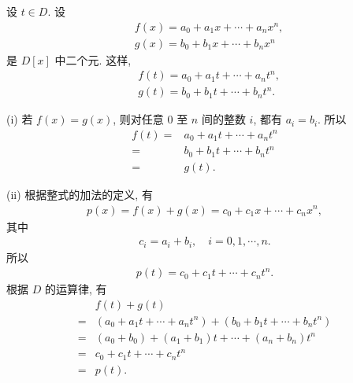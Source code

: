 \begin{pf}
    设 $t \in D$. 设
    \begin{align*}
         & f(x) = a_0 + a_1 x + \cdots + a_n x^n, \\
         & g(x) = b_0 + b_1 x + \cdots + b_n x^n
    \end{align*}
    是 $D[x]$ 中二个元. 这样,
    \begin{align*}
         & f(t) = a_0 + a_1 t + \cdots + a_n t^n, \\
         & g(t) = b_0 + b_1 t + \cdots + b_n t^n.
    \end{align*}

    (i) 若 $f(x) = g(x)$, 则对任意 $0$ 至 $n$ 间的整数 $i$, 都有 $a_i = b_i$. 所以
    \begin{align*}
        f(t)
        = {} & a_0 + a_1 t + \cdots + a_n t^n \\
        = {} & b_0 + b_1 t + \cdots + b_n t^n \\
        = {} & g(t).
    \end{align*}

    (ii) 根据整式的加法的定义, 有
    \begin{align*}
        p(x) = f(x) + g(x) = c_0 + c_1 x + \cdots + c_n x^n,
    \end{align*}
    其中
    \begin{align*}
        c_i = a_i + b_i, \quad i = 0,1,\cdots,n.
    \end{align*}
    所以
    \begin{align*}
        p(t) = c_0 + c_1 t + \cdots + c_n t^n.
    \end{align*}
    根据 $D$ 的运算律, 有
    \begin{align*}
             & f(t) + g(t)                                                         \\
        = {} & (a_0 + a_1 t + \cdots + a_n t^n) + (b_0 + b_1 t + \cdots + b_n t^n) \\
        = {} & (a_0 + b_0) + (a_1 + b_1) t + \cdots + (a_n + b_n) t^n              \\
        = {} & c_0 + c_1 t + \cdots + c_n t^n                                      \\
        = {} & p(t).
    \end{align*}


\end{pf}
